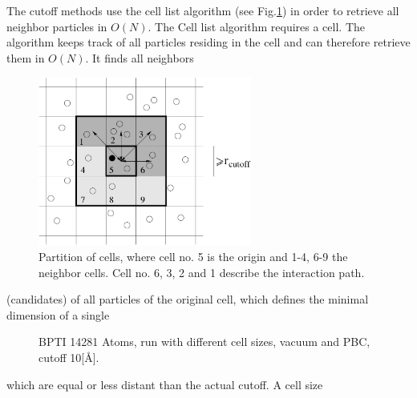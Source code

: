 \documentclass[11pt]{article}
\begin{document}
The cutoff methods use the cell list algorithm (see
Fig.\ref{fig:cellalg}) in order to retrieve all
neighbor particles in $O(N)$. The Cell list algorithm requires a
cell. The algorithm keeps track of all particles residing in the cell
and can therefore retrieve them in $O(N)$. It finds all neighbors
\begin{figure}[hb]
\centerline{\includegraphics[width=7cm]{cell_algo_cell.pdf}}
\caption{Partition of cells, where cell no. 5 is the
    origin and 1-4, 6-9 the neighbor cells. Cell no. 6, 3, 2 and 1
    describe the interaction path.}
\label{fig:cellalg}
\end{figure}
(candidates) of all particles of the original cell, which defines the minimal dimension of a single
\begin{figure}[hbt]
\centerline{}
\caption{BPTI 14281 Atoms, run with different cell sizes, vacuum and
  PBC, cutoff 10[\AA].}
\label{fig:cellsize}
\end{figure}
which are equal or less distant than the actual cutoff. A cell size
\end{document}
